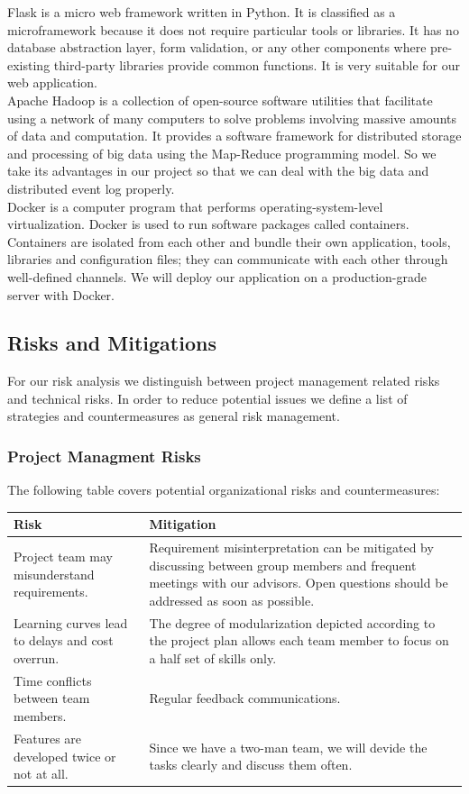 \documentclass[runningheads]{llncs}
\begin{document}
\noindent
Flask\cite{Flask} is a micro web framework written in Python. It is classified as a microframework because it does not require particular tools or libraries. It has no database abstraction layer, form validation, or any other components where pre-existing third-party libraries provide common functions. It is very suitable for our web application.\\

\noindent
Apache Hadoop\cite{Hadoop} is a collection of open-source software utilities that facilitate using a network of many computers to solve problems involving massive amounts of data and computation. It provides a software framework for distributed storage and processing of big data using the Map-Reduce programming model. So we take its advantages in our project so that we can deal with the big data and distributed event log properly.\\

\noindent
Docker\cite{Docker} is a computer program that performs operating-system-level virtualization. Docker is used to run software packages called containers. Containers are isolated from each other and bundle their own application, tools, libraries and configuration files; they can communicate with each other through well-defined channels. We will deploy our application on a production-grade server with Docker.

\subsection{Risks and Mitigations}
For our risk analysis we distinguish between project management related risks and technical risks. In order to reduce potential issues we define a list of strategies and countermeasures as general risk management.

\subsubsection{Project Managment Risks}

The following table covers potential organizational risks and countermeasures:\\

\renewcommand\arraystretch{1.5}
\begin{tabular}{p{5cm}|p{6cm}}
	Risk& Mitigation\\
	\hline
	Project team may misunderstand requirements.& Requirement misinterpretation can be mitigated by discussing between group members and frequent meetings with our advisors. Open questions should be addressed as soon as possible.\\
	\hline
	Learning curves lead to delays and cost overrun.& The degree of modularization depicted according to the project plan allows each team member to focus on a half set of skills only.\\
	\hline
	Time conflicts between team members.& Regular feedback communications.\\
	\hline
	Features are developed twice or not at all.& Since we have a two-man team, we will devide the tasks clearly and discuss them often.\\
\end{tabular}
\end{document}
